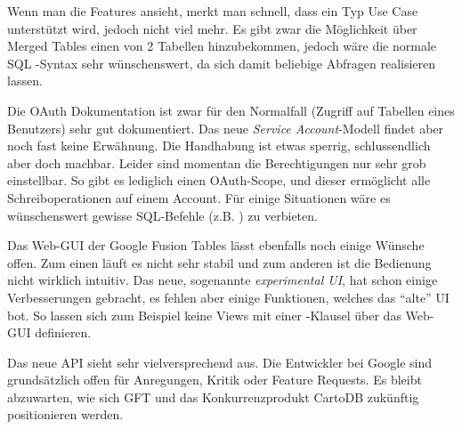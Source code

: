 Wenn man die Features ansieht, merkt man schnell, dass ein Typ Use Case unterstützt wird, jedoch nicht viel mehr. Es gibt zwar die Möglichkeit über Merged Tables einen  von 2 Tabellen hinzubekommen, jedoch wäre die normale SQL -Syntax sehr wünschenswert, da sich damit beliebige Abfragen realisieren lassen. 

Die OAuth Dokumentation ist zwar für den Normalfall (Zugriff auf Tabellen eines Benutzers) sehr gut dokumentiert. Das neue \emph{Service Account}-Modell findet aber noch fast keine Erwähnung. Die Handhabung ist etwas sperrig, schlussendlich aber doch machbar. Leider sind momentan die Berechtigungen nur sehr grob einstellbar. So gibt es lediglich einen OAuth-Scope, und dieser ermöglicht alle Schreiboperationen auf einem Account. Für einige Situationen wäre es wünschenswert gewisse SQL-Befehle (z.B. ) zu verbieten.

Das Web-GUI der Google Fusion Tables lässt ebenfalls noch einige Wünsche offen. Zum einen läuft es nicht sehr stabil und zum anderen ist die Bedienung nicht wirklich intuitiv. Das neue, sogenannte \emph{experimental UI}, hat schon einige Verbesserungen gebracht, es fehlen aber einige Funktionen, welches das "`alte"' UI bot. So lassen sich zum Beispiel keine Views mit einer -Klausel über das Web-GUI definieren. 

Das neue API sieht sehr vielversprechend aus. Die Entwickler bei Google sind grundsätzlich offen für Anregungen, Kritik oder Feature Requests. Es bleibt abzuwarten, wie sich GFT und das Konkurrenzprodukt CartoDB zukünftig positionieren werden.